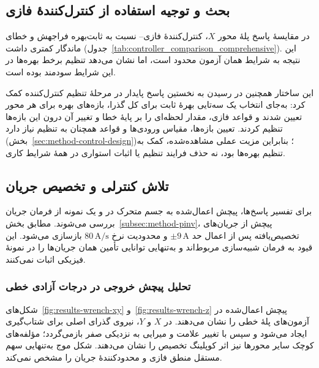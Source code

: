 \subsection{بحث و توجیه استفاده از کنترل‌کنندهٔ فازی}
\label{subsec:results-fuzzy-justification}

در مقایسهٔ پاسخ پلهٔ محور $X$، کنترل‌کنندهٔ فازی-- نسبت به  ثابت‌بهره فراجهش و خطای ماندگار کمتری داشت (جدول~\ref{tab:controller_comparison_comprehensive}). این نتیجه به شرایط همان آزمون محدود است، اما نشان می‌دهد تنظیم برخط بهره‌ها در این شرایط سودمند بوده است.

این ساختار همچنین در رسیدن به نخستین پاسخ پایدار در مرحلهٔ تنظیم کنترل‌کننده کمک کرد: به‌جای انتخاب یک سه‌تایی بهرهٔ ثابت برای کل گذرا، بازه‌های بهره برای هر محور تعیین شدند و قواعد فازی، مقدار لحظه‌ای را بر پایهٔ خطا و تغییر آن درون این بازه‌ها تنظیم کردند. تعیین بازه‌ها، مقیاس ورودی‌ها و قواعد همچنان به تنظیم نیاز دارد (بخش~\ref{sec:method-control-design})؛ بنابراین مزیت عملی مشاهده‌شده، کمک به تنظیم بهره‌ها بود، نه حذف فرایند تنظیم یا اثبات استواری در همهٔ شرایط کاری.

\subsection{تلاش کنترلی و تخصیص جریان}
\label{subsec:results-control-effort}

برای تفسیر پاسخ‌ها، پیچش اعمال‌شده به جسم متحرک در  و یک نمونه از فرمان جریان بررسی می‌شوند. مطابق بخش~\ref{subsec:method-pinv}، پیچش از جریان‌های تخصیص‌یافته پس از اعمال حد $\pm9\,\mathrm A$ و محدودیت نرخ $80\,\mathrm{A/s}$ بازسازی می‌شود. این قیود به فرمان شبیه‌سازی مربوط‌اند و به‌تنهایی توانایی تأمین همان جریان‌ها را در نمونهٔ فیزیکی اثبات نمی‌کنند.

\subsubsection{تحلیل پیچش خروجی در درجات آزادی خطی}
\label{subsubsec:results-wrench-linear}

شکل‌های~\ref{fig:results-wrench-xy} و~\ref{fig:results-wrench-z} پیچش اعمال‌شده در آزمون‌های پلهٔ خطی را نشان می‌دهند. در $X$ و $Y$، نیروی گذرای اصلی برای شتاب‌گیری ایجاد می‌شود و سپس با تغییر علامت و میرایی به نزدیکی صفر بازمی‌گردد؛ مؤلفه‌های کوچک سایر محورها نیز اثر کوپلینگ تخصیص را نشان می‌دهند. شکل موج به‌تنهایی سهم مستقل منطق فازی و محدودکنندهٔ جریان را مشخص نمی‌کند.

